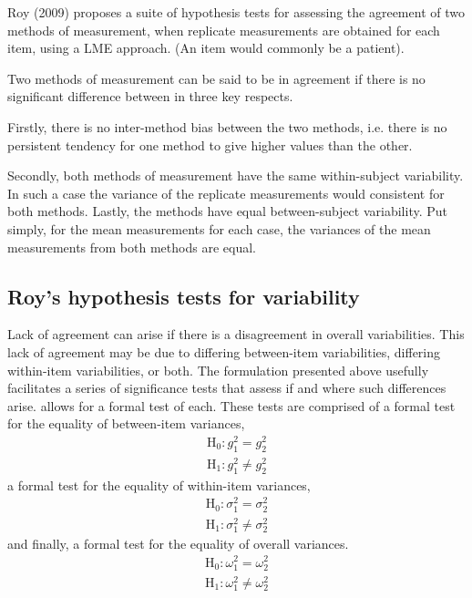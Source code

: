 \documentclass[12pt, a4paper]{report}
\theoremstyle{plain}
\theoremstyle{definition}
\theoremstyle{remark}
\begin{document}
Roy (2009) proposes a suite of hypothesis tests for assessing the agreement of two methods of measurement, when replicate measurements are obtained for each item, using a LME approach. (An item would commonly be a patient).  

Two methods of measurement can be said to be in agreement if there is no significant difference between in three key respects. 

Firstly, there is no inter-method bias between the two methods, i.e. there is no persistent tendency for one method to give higher values than the other.

Secondly, both methods of measurement have the same  within-subject variability. In such a case the variance of the replicate measurements would consistent for both methods.
Lastly, the methods have equal between-subject variability.  Put simply, for the mean measurements for each case, the variances of the mean measurements from both methods are equal.

\subsection{Roy's hypothesis tests for variability}
Lack of agreement can arise if there is a disagreement in overall variabilities. This lack of agreement may be due to differing between-item variabilities, differing within-item variabilities, or both. The formulation presented above usefully facilitates a series of significance tests that assess if and where such differences arise. \citet{roy} allows for a formal test of each. These tests are comprised of a formal test for the equality of between-item variances,
\begin{eqnarray*}
	\operatorname{H_0} : g^2_1 = g^2_2 \\
	\operatorname{H_1} : g^2_1 \neq g^2_2
\end{eqnarray*}
a formal test for the equality of within-item variances,
\begin{eqnarray*}
	\operatorname{H_0} : \sigma^2_1 = \sigma^2_2 \\
	\operatorname{H_1} : \sigma^2_1 \neq \sigma^2_2
\end{eqnarray*}
and finally, a formal test for the equality of overall variances.
\begin{eqnarray*}
	\operatorname{H_0} : \omega^2_1 = \omega^2_2 \\
	\operatorname{H_1} : \omega^2_1 \neq \omega^2_2
\end{eqnarray*}
\end{document}

